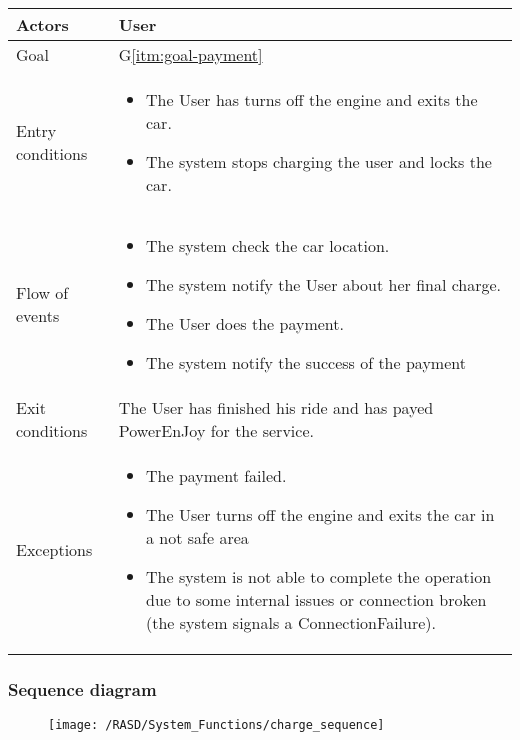 \begin{center}
  \begin{tabular}{ l | p{10cm} }
    \hline
    Actors & User\\ \hline
    Goal & G\ref{itm:goal-payment}\\ \hline
    Entry conditions & 
    \begin{itemize}
    \item The User has turns off the engine and exits the car.
    \item The system stops charging the user and locks the car.
    \end{itemize} \\ \hline
    Flow of events &
\begin{itemize}
\item The system check the car location.
\item The system notify the User about her final charge.
\item The User does the payment.
\item The system notify the success of the payment
\end{itemize} \\ \hline
    Exit conditions & The User has finished his ride and has payed PowerEnJoy for the service. \\ \hline
  Exceptions & 
\begin{itemize}
\item The payment failed.
\item The User turns off the engine and exits the car in a not safe area
\item The system is not able to complete the operation due to some internal issues or connection broken (the system signals a ConnectionFailure).%
\end{itemize} \\ \hline
  \end{tabular}
\end{center}


\subsubsection{Sequence diagram}
\begin{figure}[!ht]
  \centering
  \vspace{0.1cm}
  \texttt{[image: /RASD/System\_Functions/charge\_sequence]}\\
  \vspace{0.1cm}
  \label{fig:charge_sequence} 
\end{figure}

